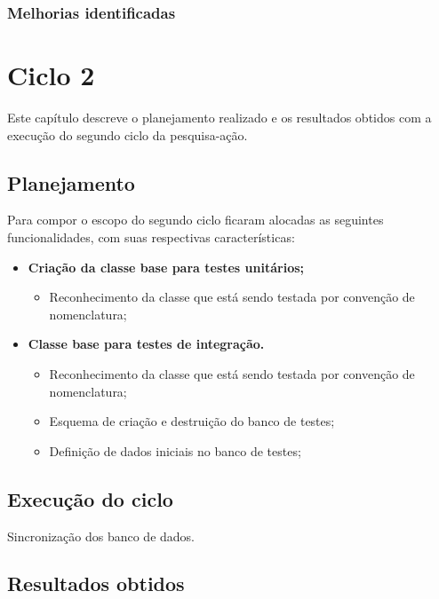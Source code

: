       \subsection{Melhorias identificadas}
    

\chapter{Ciclo 2}

  Este capítulo descreve o planejamento realizado e os resultados obtidos com a execução do segundo ciclo da pesquisa-ação.
  
  \section{Planejamento}
  
      Para compor o escopo do segundo ciclo ficaram alocadas as seguintes funcionalidades, com suas respectivas características:
      
     \begin{itemize}
      \item \textbf{Criação da classe base para testes unitários;}
	\begin{itemize}
	  \item Reconhecimento da classe que está sendo testada por convenção de nomenclatura;
	\end{itemize}

      \item \textbf{Classe base para testes de integração.}
	\begin{itemize}
	  \item Reconhecimento da classe que está sendo testada por convenção de nomenclatura;
	  \item Esquema de criação e destruição do banco de testes;
	  \item Definição de dados iniciais no banco de testes;
	\end{itemize}
      \end{itemize}

  \section{Execução do ciclo}
      
      Sincronização dos banco de dados.
  
  \section{Resultados obtidos}
  
